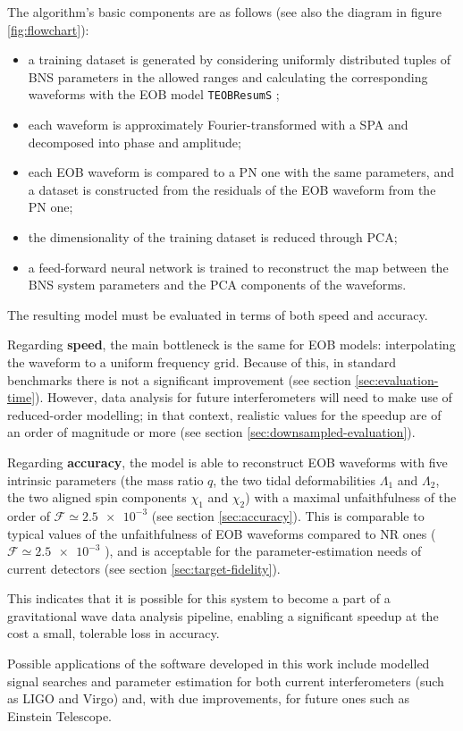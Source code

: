 \documentclass[main.tex]{subfiles}
\begin{document}
The algorithm's basic components are as follows (see also the diagram in figure \ref{fig:flowchart}):
\begin{itemize}
    \item a training dataset is generated by considering uniformly distributed tuples of \ac{BNS} parameters in the allowed ranges and calculating the corresponding waveforms with the \ac{EOB} model \texttt{TEOBResumS} \cite[]{nagarTimedomainEffectiveonebodyGravitational2018};
    \item each waveform is approximately Fourier-transformed with a \ac{SPA} \cite[]{gambaFastFaithfulFrequencydomain2020} and decomposed into phase and amplitude;
    \item each \ac{EOB} waveform is compared to a \ac{PN} one with the same parameters, and a dataset is constructed from the residuals of the \ac{EOB} waveform from the \ac{PN} one;
    \item the dimensionality of the training dataset is reduced through \ac{PCA};
    \item a feed-forward neural network is trained to reconstruct the map between the \ac{BNS} system parameters and the \ac{PCA} components of the waveforms. 
\end{itemize}

The resulting model must be evaluated in terms of both speed and accuracy.

Regarding \textbf{speed}, the main bottleneck is the same for \ac{EOB} models: interpolating the waveform to a uniform frequency grid. 
Because of this, in standard benchmarks there is not a significant improvement (see section \ref{sec:evaluation-time}). 
However, data analysis for future interferometers will need to make use of reduced-order modelling; in that context, realistic values for the  speedup are of an order of magnitude or more (see section \ref{sec:downsampled-evaluation}). 

Regarding \textbf{accuracy}, the model is able to reconstruct \ac{EOB} waveforms with five intrinsic parameters (the mass ratio \(q\), the two tidal deformabilities \(\Lambda_1\) and \(\Lambda_2 \), the two aligned spin components \(\chi_1 \) and \(\chi_2 \)) with a maximal unfaithfulness of the order of \(\mathcal{F} \simeq \num{2.5e-3}\) (see section \ref{sec:accuracy}).
This is comparable to typical values of the unfaithfulness of EOB waveforms compared to \ac{NR} ones (\(\mathcal{F} \simeq \num{2.5e-3}\) \cite{nagarTimedomainEffectiveonebodyGravitational2018}), and is acceptable for the parameter-estimation needs of current detectors (see section \ref{sec:target-fidelity}).

This indicates that it is possible for this system to become a part of a gravitational wave data analysis pipeline, enabling a significant speedup at the cost a small, tolerable loss in accuracy.

Possible applications of the software developed in this work include modelled signal searches and parameter estimation for both current interferometers (such as LIGO and Virgo) and, with due improvements, for future ones such as Einstein Telescope.
\end{document}
